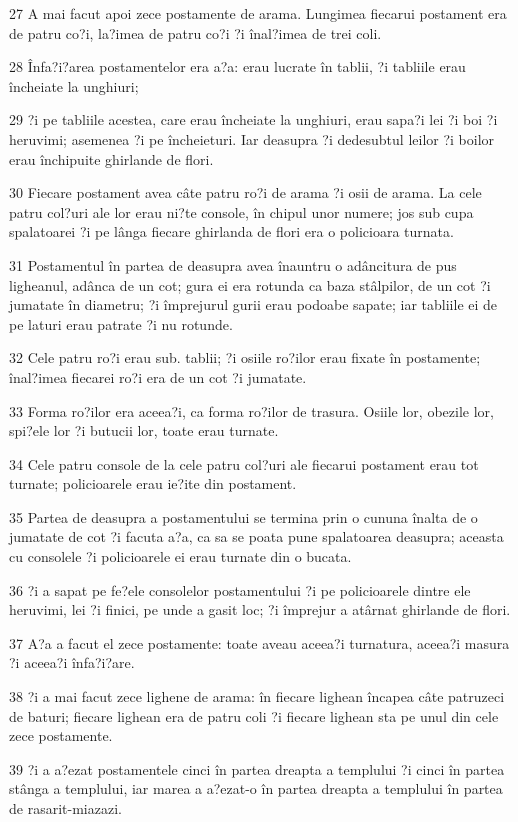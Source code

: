 \par 27 A mai facut apoi zece postamente de arama. Lungimea fiecarui postament era de patru co?i, la?imea de patru co?i ?i înal?imea de trei coli.
\par 28 Înfa?i?area postamentelor era a?a: erau lucrate în tablii, ?i tabliile erau încheiate la unghiuri;
\par 29 ?i pe tabliile acestea, care erau încheiate la unghiuri, erau sapa?i lei ?i boi ?i heruvimi; asemenea ?i pe încheieturi. Iar deasupra ?i dedesubtul leilor ?i boilor erau închipuite ghirlande de flori.
\par 30 Fiecare postament avea câte patru ro?i de arama ?i osii de arama. La cele patru col?uri ale lor erau ni?te console, în chipul unor numere; jos sub cupa spalatoarei ?i pe lânga fiecare ghirlanda de flori era o policioara turnata.
\par 31 Postamentul în partea de deasupra avea înauntru o adâncitura de pus ligheanul, adânca de un cot; gura ei era rotunda ca baza stâlpilor, de un cot ?i jumatate în diametru; ?i împrejurul gurii erau podoabe sapate; iar tabliile ei de pe laturi erau patrate ?i nu rotunde.
\par 32 Cele patru ro?i erau sub. tablii; ?i osiile ro?ilor erau fixate în postamente; înal?imea fiecarei ro?i era de un cot ?i jumatate.
\par 33 Forma ro?ilor era aceea?i, ca forma ro?ilor de trasura. Osiile lor, obezile lor, spi?ele lor ?i butucii lor, toate erau turnate.
\par 34 Cele patru console de la cele patru col?uri ale fiecarui postament erau tot turnate; policioarele erau ie?ite din postament.
\par 35 Partea de deasupra a postamentului se termina prin o cununa înalta de o jumatate de cot ?i facuta a?a, ca sa se poata pune spalatoarea deasupra; aceasta cu consolele ?i policioarele ei erau turnate din o bucata.
\par 36 ?i a sapat pe fe?ele consolelor postamentului ?i pe policioarele dintre ele heruvimi, lei ?i finici, pe unde a gasit loc; ?i împrejur a atârnat ghirlande de flori.
\par 37 A?a a facut el zece postamente: toate aveau aceea?i turnatura, aceea?i masura ?i aceea?i înfa?i?are.
\par 38 ?i a mai facut zece lighene de arama: în fiecare lighean încapea câte patruzeci de baturi; fiecare lighean era de patru coli ?i fiecare lighean sta pe unul din cele zece postamente.
\par 39 ?i a a?ezat postamentele cinci în partea dreapta a templului ?i cinci în partea stânga a templului, iar marea a a?ezat-o în partea dreapta a templului în partea de rasarit-miazazi.

